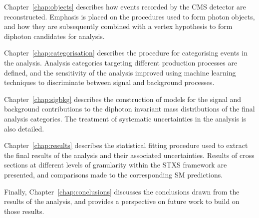Chapter~\ref{chap:objects} describes how events recorded by the CMS detector are reconstructed.
Emphasis is placed on the procedures used to form photon objects, 
and how they are subsequently combined with a vertex hypothesis to form diphoton candidates 
for \Hgg analysis.

Chapter~\ref{chap:categorisation} describes the procedure for categorising events in the \Hgg analysis.
Analysis categories targeting different production processes are defined, 
and the sensitivity of the analysis improved 
using machine learning techniques to discriminate between signal and background processes.

Chapter~\ref{chap:sigbkg} describes the construction of models for the signal and background 
contributions to the diphoton invariant mass distributions of the final analysis categories.
The treatment of systematic uncertainties in the analysis is also detailed.

Chapter~\ref{chap:results} describes the statistical fitting procedure used 
to extract the final results of the analysis and their associated uncertainties.
Results of cross sections at different levels of granularity within the STXS framework 
are presented, and comparisons made to the corresponding SM predictions.

Finally, Chapter~\ref{chap:conclusions} discusses the conclusions drawn from the results of the analysis, 
and provides a perspective on future work to build on those results.
